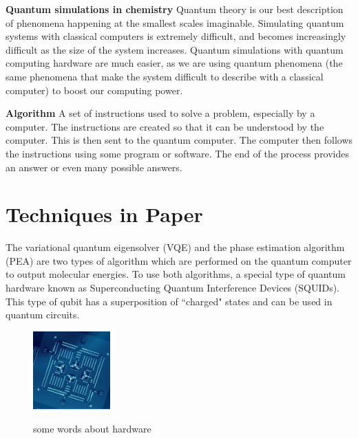 \documentclass[14pt,landscape,color=UCLdarkred,margin=3cm]{uclposter}
\begin{document}
\begin{multicols}{3}
\begin{highlightbox}
\textbf{Quantum simulations in chemistry} Quantum theory is our best description of phenomena happening at the smallest scales imaginable. Simulating quantum systems with classical computers is extremely difficult, and becomes increasingly difficult as the size of the system increases. Quantum simulations with quantum computing hardware are much easier, as we are using quantum phenomena (the same phenomena that make the system difficult to describe with a classical computer) to boost our computing power.
\end{highlightbox}

\begin{highlightbox}
\textbf{Algorithm} A set of instructions used to solve a problem, especially by a computer. The instructions are created so that it can be understood by the computer. This is then sent to the quantum computer. The computer then follows the instructions using some program or software. The end of the process provides an answer or even many possible answers.
\end{highlightbox}

\columnbreak

\section*{Techniques in Paper}

The variational quantum eigensolver (VQE) and the phase estimation algorithm (PEA) are two types of algorithm which are performed on the quantum computer to output molecular energies. To use both algorithms, a special type of quantum hardware known as Superconducting Quantum Interference Devices (SQUIDs). This type of qubit has a superposition of ``charged" states and can be used in quantum circuits.

\begin{figure}[H]
  \begin{center}
  \begin{minipage}[c]{8em}
    \includegraphics[width=8em]{4_Qubit.png}
  \end{minipage}
  \qquad
  \begin{minipage}[c]{20em}\large
    some words about hardware
  \end{minipage}
  \end{center}


\end{figure}
\end{multicols}
\end{document}
